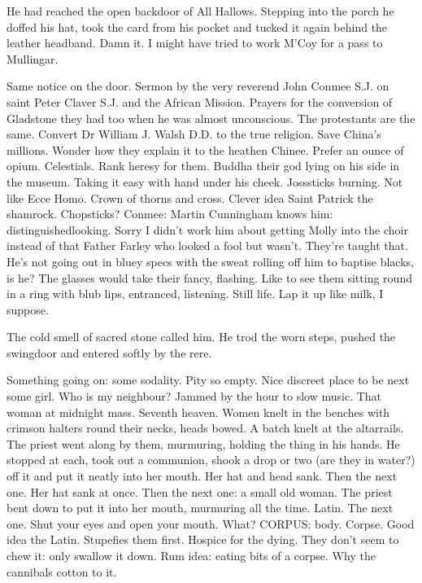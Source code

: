He had reached the open backdoor of All Hallows. Stepping into the
porch he doffed his hat, took the card from his pocket and tucked it again
behind the leather headband. Damn it. I might have tried to work M'Coy
for a pass to Mullingar.

Same notice on the door. Sermon by the very reverend John Conmee
S.J. on saint Peter Claver S.J. and the African Mission. Prayers for the
conversion of Gladstone they had too when he was almost unconscious.
The protestants are the same. Convert Dr William J. Walsh D.D. to the
true religion. Save China's millions. Wonder how they explain it to the
heathen Chinee. Prefer an ounce of opium. Celestials. Rank heresy for
them. Buddha their god lying on his side in the museum. Taking it easy
with hand under his cheek. Josssticks burning. Not like Ecce Homo. Crown
of thorns and cross. Clever idea Saint Patrick the shamrock. Chopsticks?
Conmee: Martin Cunningham knows him: distinguishedlooking. Sorry I
didn't work him about getting Molly into the choir instead of that Father
Farley who looked a fool but wasn't. They're taught that. He's not going
out in bluey specs with the sweat rolling off him to baptise blacks, is
he? The glasses would take their fancy, flashing. Like to see them sitting
round in a ring with blub lips, entranced, listening. Still life. Lap it
up like milk, I suppose.


The cold smell of sacred stone called him. He trod the worn steps,
pushed the swingdoor and entered softly by the rere.

Something going on: some sodality. Pity so empty. Nice discreet place
to be next some girl. Who is my neighbour? Jammed by the hour to slow
music. That woman at midnight mass. Seventh heaven. Women knelt in the
benches with crimson halters round their necks, heads bowed. A batch knelt
at the altarrails. The priest went along by them, murmuring, holding the
thing in his hands. He stopped at each, took out a communion, shook a
drop or two (are they in water?) off it and put it neatly into her mouth.
Her hat and head sank. Then the next one. Her hat sank at once. Then the
next one: a small old woman. The priest bent down to put it into her
mouth, murmuring all the time. Latin. The next one. Shut your eyes and
open your mouth. What? CORPUS: body. Corpse. Good idea the Latin.
Stupefies them first. Hospice for the dying. They don't seem to chew it:
only swallow it down. Rum idea: eating bits of a corpse. Why the cannibals
cotton to it.

